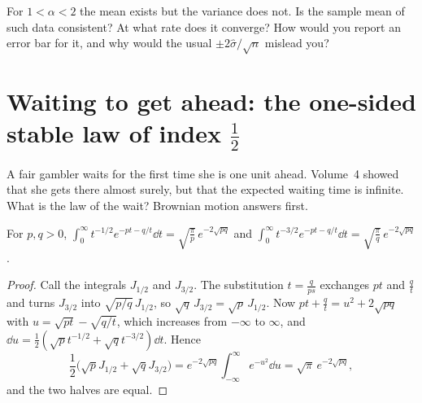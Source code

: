 \begin{think}
For $1<\alpha<2$ the mean exists but the variance does not. Is the sample mean of such data consistent? At what rate does it converge? How would you
report an error bar for it, and why would the usual $\pm2\hat\sigma/\sqrt n$ mislead you?
\end{think}

\section{Waiting to get ahead: the one-sided stable law of index $\frac12$}

A fair gambler waits for the first time she is one unit ahead. Volume~4 showed that she gets there almost surely, but that the expected waiting time is
infinite. What is the law of the wait? Brownian motion answers first.

\begin{lemma}\label{lem:schlomilch}
For $p,q>0$, $\displaystyle\int_0^\infty t^{-1/2}e^{-pt-q/t}\dd t=\sqrt{\frac\pi p}\,e^{-2\sqrt{pq}}$ and $\displaystyle\int_0^\infty t^{-3/2}e^{-pt-q/t}\dd t=\sqrt{\frac\pi q}\,e^{-2\sqrt{pq}}$.
\end{lemma}
\begin{proof}
Call the integrals $J_{1/2}$ and $J_{3/2}$. The substitution $t=\frac q{ps}$ exchanges $pt$ and $\frac qt$ and turns $J_{3/2}$ into $\sqrt{p/q}\,J_{1/2}$, so
$\sqrt q\,J_{3/2}=\sqrt p\,J_{1/2}$. Now $pt+\frac qt=u^2+2\sqrt{pq}$ with $u=\sqrt{pt}-\sqrt{q/t}$, which increases from $-\infty$ to $\infty$, and
$\dd u=\frac12(\sqrt pt^{-1/2}+\sqrt qt^{-3/2})\dd t$. Hence
\[
\frac12\bigl(\sqrt pJ_{1/2}+\sqrt qJ_{3/2}\bigr)=e^{-2\sqrt{pq}}\int_{-\infty}^\infty e^{-u^2}\dd u=\sqrt\pi\,e^{-2\sqrt{pq}},
\]
and the two halves are equal.
\end{proof}

